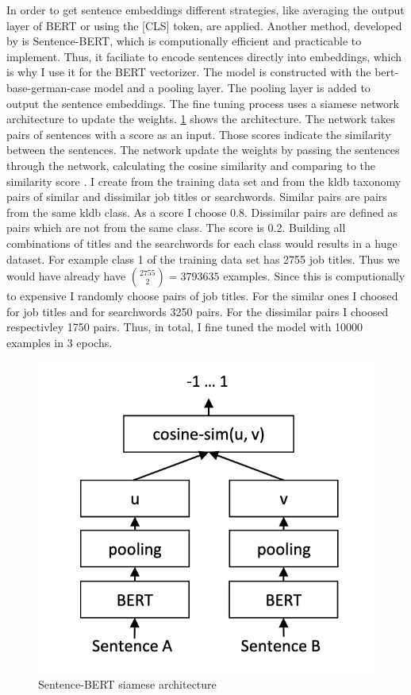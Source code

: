 \documentclass[12pt, a4paper, titlepage]{article}
\begin{document}
In order to get sentence embeddings different strategies, like averaging the output layer of \ac{BERT} or using the [CLS] token, are applied. Another method, developed by \citet{reimers2019} is Sentence-\ac{BERT}, which is computionally efficient and practicable to implement. Thus, it faciliate to encode sentences directly into embeddings, which is why I use it for the \ac{BERT} vectorizer. The model is constructed with the bert-base-german-case model and a pooling layer. The pooling layer is added to output the sentence embeddings. The fine tuning process uses a siamese network architecture to update the weights. \ref{fig: F5} shows the architecture. The network takes pairs of sentences with a score as an input. Those scores indicate the similarity between the sentences. The network update the weights by passing the sentences through the network, calculating the cosine similarity and comparing to the similarity score \citep{reimers2019}.
I create from the training data set and from the kldb taxonomy pairs of similar and dissimilar job titles or searchwords. Similar pairs are pairs from the same kldb class. As a score I choose 0.8. Dissimilar pairs are defined as pairs which are not from the same class. The score is 0.2. Building all combinations of titles and the searchwords for each class would results in a huge dataset. For example class 1 of the training data set has 2755 job titles. Thus we would have already have ${2755 \choose 2} = 3793635$ examples. Since this is computionally to expensive I randomly choose pairs of job titles. For the similar ones I choosed for job titles and for searchwords 3250 pairs. For the dissimilar pairs I choosed respectivley 1750 pairs. Thus, in total, I fine tuned the model with 10000 examples in 3 epochs.

\begin{figure}[hb!]
  \center
  \includegraphics[scale=0.5]{SBERT.png}
  \caption{\label{fig: F5} Sentence-\ac{BERT} siamese architecture \citep[3]{reimers2019}}
\end{figure}
\end{document}
